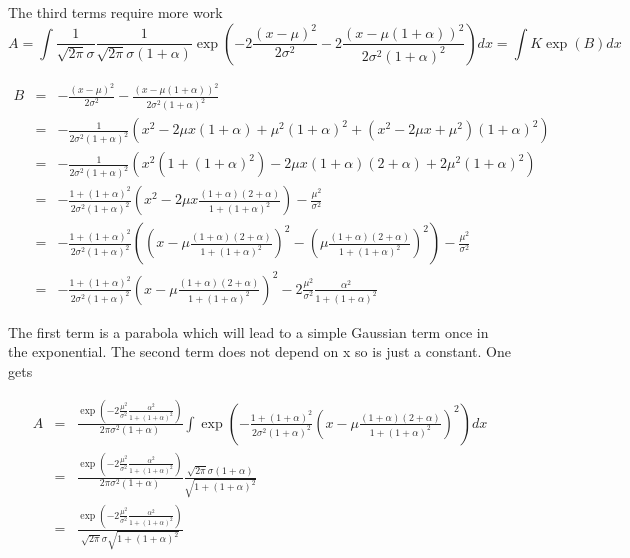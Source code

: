 The third terms require more work
\begin{equation}
A = \int \frac{1}{\sqrt{2\pi}\sigma} \frac{1}{\sqrt{2\pi}\sigma (1+\alpha)} \exp\left( -2\frac{(x-\mu)^2}{2\sigma^2}  -2\frac{(x-\mu(1+\alpha))^2}{2\sigma^2(1+\alpha)^2}\right) dx = \int K \exp(B)dx
\end{equation}

\begin{equation}
\begin{array}{lcl}
B &=& -\frac{(x-\mu)^2}{2\sigma^2}  -\frac{(x-\mu(1+\alpha))^2}{2\sigma^2(1+\alpha)^2}\\
&=& - \frac{1}{2\sigma^2(1+\alpha)^2} \left(  x^2 - 2\mu x(1+\alpha) + \mu^2(1+\alpha)^2 + (x^2 -2\mu x + \mu^2)(1+\alpha)^2 \right) \\
&=& - \frac{1}{2\sigma^2(1+\alpha)^2} \left(  x^2 (1+(1+\alpha)^2) - 2\mu x(1+\alpha)(2+\alpha) + 2\mu^2(1+\alpha)^2  \right) \\


&=& - \frac{1+(1+\alpha)^2}{2\sigma^2(1+\alpha)^2} \left(  x^2  - 2\mu x \frac{(1+\alpha)(2+\alpha)}{1+(1+\alpha)^2} \right) - \frac{\mu^2}{\sigma^2}   \\

&=& - \frac{1+(1+\alpha)^2}{2\sigma^2(1+\alpha)^2} \left(  (x-\mu \frac{(1+\alpha)(2+\alpha)}{1+(1+\alpha)^2})^2 -  \left( \mu \frac{(1+\alpha)(2+\alpha)}{1+(1+\alpha)^2}\right) ^2 \right) - \frac{\mu^2}{\sigma^2}   \\

&=& - \frac{1+(1+\alpha)^2}{2\sigma^2(1+\alpha)^2} \left( x-\mu \frac{(1+\alpha)(2+\alpha)}{1+(1+\alpha)^2} \right)^2 - 2 \frac{\mu^2}{\sigma^2} \frac{\alpha^2}{1+(1+\alpha)^2}
\end{array}
\end{equation}

The first term is a parabola which will lead to a simple Gaussian term once in the exponential.
The second term does not depend on x so is  just a constant.
One  gets

\begin{equation}
\begin{array}{lcl}
A &=&
\frac{\exp\left(-2 \frac{\mu^2}{\sigma^2} \frac{\alpha^2}{1+(1+\alpha)^2}\right)}{2\pi\sigma^2(1+\alpha)}
\int  \exp\left( - \frac{1+(1+\alpha)^2}{2\sigma^2(1+\alpha)^2} (x-\mu \frac{(1+\alpha)(2+\alpha)}{1+(1+\alpha)^2})^2 \right) dx \\
&=& \frac{\exp\left( -2 \frac{\mu^2}{\sigma^2} \frac{\alpha^2}{1+(1+\alpha)^2}\right)}{2\pi\sigma^2(1+\alpha)} \frac{\sqrt{2\pi}\sigma(1+\alpha)}{\sqrt{1+(1+\alpha)^2}} \\
&=& \frac{\exp\left(-2 \frac{\mu^2}{\sigma^2} \frac{\alpha^2}{1+(1+\alpha)^2}\right)}{\sqrt{2\pi}\sigma\sqrt{1+(1+\alpha)^2}}  \\
\end{array}
\end{equation}


